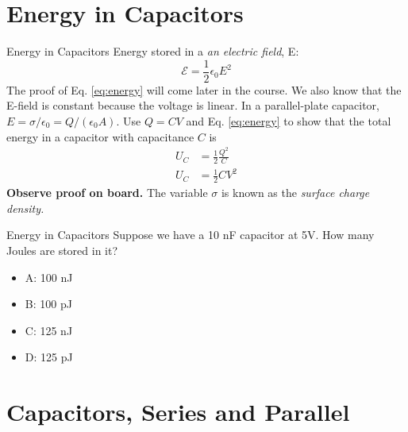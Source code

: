 \documentclass{beamer}
\begin{document}
\section{Energy in Capacitors}

\begin{frame}{Energy in Capacitors}
Energy stored in a \textit{an electric field}, E:
\begin{equation}
\mathcal{E} = \frac{1}{2} \epsilon_0 E^2 \label{eq:energy}
\end{equation}
The proof of Eq. \ref{eq:energy} will come later in the course.  We also know that the E-field is constant because the voltage is linear.  In a parallel-plate capacitor, $E=\sigma/\epsilon_0 = Q/(\epsilon_0 A)$. Use $Q = C V$ and Eq. \ref{eq:energy} to show that the total energy in a capacitor with capacitance $C$ is 
\begin{align}
U_C &= \frac{1}{2} \frac{Q^2}{C} \\
U_C &= \frac{1}{2} CV^2
\end{align}
\textbf{Observe proof on board.} The variable $\sigma$ is known as the \textit{surface charge density.}
\end{frame}

\begin{frame}{Energy in Capacitors}
Suppose we have a 10 nF capacitor at 5V.  How many Joules are stored in it?
\begin{itemize}
\item A: 100 nJ
\item B: 100 pJ
\item C: 125 nJ
\item D: 125 pJ
\end{itemize}
\end{frame}

\section{Capacitors, Series and Parallel}
\end{document}
